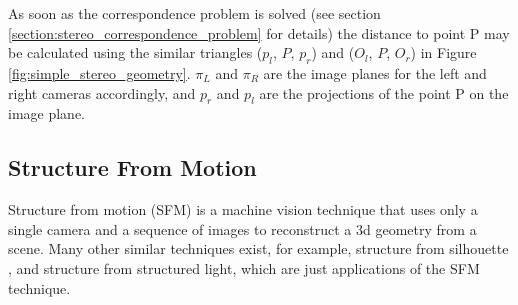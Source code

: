 \documentclass[12pt,a4paper,oneside,pdftex]{report}
\begin{document}
{%

As soon as the correspondence problem is solved (see section \ref{section:stereo_correspondence_problem} for details) the distance to point P may be calculated using the similar triangles ($p_l$, $P$, $p_r$) and ($O_l$, $P$, $O_r$) in Figure \ref{fig:simple_stereo_geometry}. $\pi_L$ and $\pi_R$ are the image planes for the left and right cameras accordingly, and $p_r$ and $p_l$ are the projections of the point P on the image plane. 











\subsection{Structure From Motion}
\label{subsection:structure_from_motion}

Structure from motion (SFM) is a machine vision technique that uses only a single camera and a sequence of images to  reconstruct a 3d geometry from a scene. Many other similar techniques exist, for example, structure from silhouette
, and structure from structured light, which are just applications of the SFM technique.

}
\end{document}
